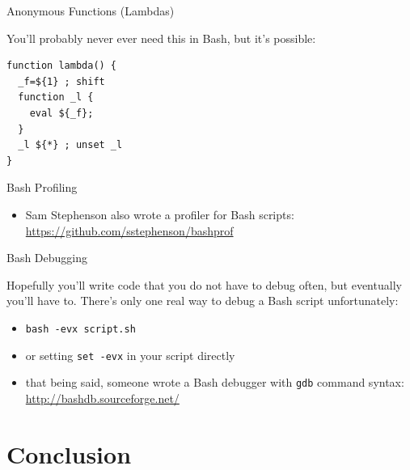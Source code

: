 \begin{frame}[fragile]{Anonymous Functions (Lambdas)}

You'll probably never ever need this in Bash, but it's possible:

\begin{verbatim}
function lambda() {
  _f=${1} ; shift
  function _l {
    eval ${_f};
  }
  _l ${*} ; unset _l
}
\end{verbatim}

\end{frame}

\begin{frame}{Bash Profiling}

\begin{itemize}
\itemsep1pt\parskip0pt
\item
  Sam Stephenson also wrote a profiler for Bash scripts:
  \url{https://github.com/sstephenson/bashprof}
\end{itemize}

\end{frame}

\begin{frame}{Bash Debugging}

Hopefully you'll write code that you do not have to debug often, but
eventually you'll have to. There's only one real way to debug a Bash
script unfortunately:

\begin{itemize}
\itemsep1pt\parskip0pt
\item
  \texttt{bash -evx script.sh}
\item
  or setting \texttt{set -evx} in your script directly
\item
  that being said, someone wrote a Bash debugger with \texttt{gdb}
  command syntax: \url{http://bashdb.sourceforge.net/}
\end{itemize}

\end{frame}

\section{Conclusion}\label{conclusion}

